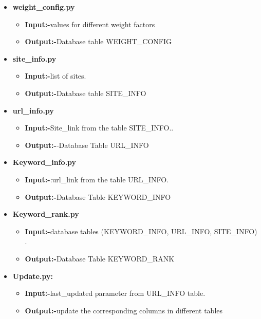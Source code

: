 \documentclass{scrreprt}
\begin{document}
\begin{itemize}
   \item \textbf{weight_config.py}
  
    \begin{itemize}
      \item \textbf{Input:-}values for different weight factors
      \item \textbf{Output:-}Database table WEIGHT_CONFIG
    \end{itemize}
  \item \textbf{site_info.py}
  
    \begin{itemize}
      \item \textbf{Input:-}list of sites.
      \item \textbf{Output:-}Database table SITE_INFO
    \end{itemize}
    
    \item \textbf{url_info.py}
  
    \begin{itemize}
      \item \textbf{Input:-}Site_link from the table  SITE_INFO..
      \item \textbf{Output:-}-Database Table URL_INFO
    \end{itemize}
    
    \item \textbf{Keyword_info.py}
  
    \begin{itemize}
      \item \textbf{Input:-}:url_link from the table URL_INFO.
      \item \textbf{Output:-}Database Table KEYWORD_INFO 
    \end{itemize}
    
    \item \textbf{Keyword_rank.py}
  
    \begin{itemize}
      \item \textbf{Input:-}database tables (KEYWORD_INFO, URL_INFO,  SITE_INFO) .
      \item \textbf{Output:-}Database Table KEYWORD_RANK
    \end{itemize}
    \item \textbf{Update.py:}
  
    \begin{itemize}
      \item \textbf{Input:-}last_updated parameter from URL_INFO table. 

      \item \textbf{Output:-}update the corresponding columns in different tables


    \end{itemize}
\end{itemize}
\end{document}
